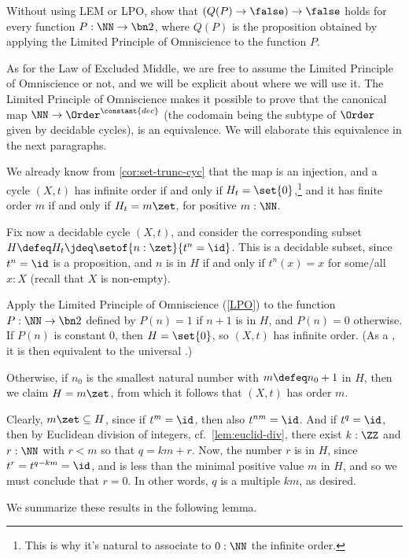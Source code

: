 \begin{xca}\label{xca:not-not-lpoP}
  Without using LEM or LPO, show that $(Q(P)\to\false)\to\false$ holds
  for every function $P:\NN\to\bn 2$, where $Q(P)$ is the proposition obtained
  by applying the Limited Principle of Omniscience to the function $P$.
\end{xca}

As for the Law of Excluded Middle, we are free to assume the Limited Principle of Omniscience
or not, and we will be explicit about where we will use it.
The Limited Principle of Omniscience makes it possible to prove that the canonical map
$\NN \to \Order^{\constant{dec}}$
(the codomain being the subtype of $\Order$ given by decidable cycles),
is an equivalence.
We will elaborate this equivalence in the next paragraphs.

We already know from \cref{cor:set-trunc-cyc} that the map is an injection,
and a cycle $(X,t)$ has infinite order
if and only if $H_t=\set{0}$,\footnote{%
  This is why it's natural to associate to $0:\NN$
  the infinite order.}
and it has finite order $m$
if and only if $H_t=m\zet$, for positive $m:\NN$.

Fix now a decidable cycle $(X,t)$,
and consider the corresponding subset $H \defeq H_t \jdeq \setof{n:\zet}{t^n=\id}$.
This is a decidable subset, since $t^n=\id$ is a proposition, and $n$ is in $H$
if and only if $t^n(x)=x$ for some/all $x:X$ (recall that $X$ is non-empty).

Apply the Limited Principle of Omniscience (\cref{LPO}) to the function $P:\NN\to\bn 2$ defined
by $P(n)=1$ if $n+1$ is in $H$, and $P(n)=0$ otherwise.
If $P(n)$ is constant $0$, then $H=\set{0}$,
so $(X,t)$ has infinite order.
(As a \covering, it is then equivalent to the universal \covering.)

Otherwise, if $n_0$ is the smallest natural number with $m\defeq n_0+1$ in $H$,
then we claim $H=m\zet$,
from which it follows that $(X,t)$ has order $m$.

Clearly, $m\zet \subseteq H$, since if $t^m=\id$, then also $t^{nm}=\id$.
And if $t^q=\id$, then by Euclidean division of integers,
cf.~\cref{lem:euclid-div},
there exist $k:\ZZ$ and $r:\NN$ with $r<m$ so that $q=km+r$.
Now, the number $r$ is in $H$, since $t^r=t^{q-km}=\id$,
and is less than the minimal positive value $m$ in $H$,
and so we must conclude that $r=0$.
In other words, $q$ is a multiple $km$, as desired.

We summarize these results in the following lemma.

